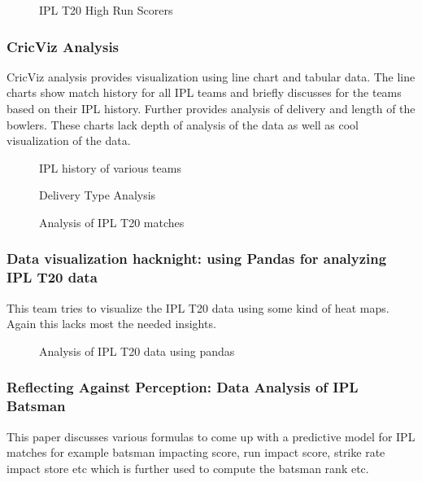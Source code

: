\documentclass[sigconf]{acmart}
\begin{document}
\begin{figure}[htbp]
\centering
{}
\caption{IPL T20 High Run Scorers}
\label{fig:t20highscorers}
\end{figure}

\subsubsection{CricViz Analysis}
CricViz analysis \cite{www-cricviz} provides visualization using line chart and tabular data.
The line charts show match history for all IPL teams and briefly discusses for the teams
based on their IPL history. Further provides analysis of delivery and length of the bowlers.
These charts lack depth of analysis of the data as well as cool visualization of the data.

 \begin{figure}[htbp]
\centering
{}
\caption{IPL history of various teams}
\label{fig:teamAnalysis}
\end{figure}

\begin{figure}[htbp]
\centering
{}
\caption{Delivery Type Analysis}
\label{fig:deliveryType}
\end{figure}

\begin{figure}[htbp]
\centering
{}
\caption{Analysis of IPL T20 matches}
\label{fig:boundarySucess}
\end{figure}

\subsubsection{Data visualization hacknight: using Pandas for analyzing IPL T20 data}
This team tries to visualize \cite{www-fifthelephant} the IPL T20 data using some kind of heat maps. 
Again this lacks most the needed insights.

\begin{figure}[htbp]
\centering
{}
\caption{Analysis of IPL T20 data using pandas}
\label{fig:heatmaps}
\end{figure}

\subsubsection{Reflecting Against Perception: Data Analysis of IPL Batsman }
This paper \cite{kumar2014reflecting} discusses various formulas to come up with
a predictive model for IPL matches for example batsman impacting score, run impact
score, strike rate impact store etc which is further used to compute the batsman rank etc. 
\end{document}
